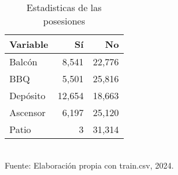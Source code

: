 \begin{table}[H]
\centering
\caption{Estadisticas de las posesiones}
\begin{tabular}{lrr}
\toprule
Variable & Sí & No \\
\midrule
Balcón & 8,541 & 22,776 \\
BBQ & 5,501 & 25,816 \\
Depósito & 12,654 & 18,663 \\
Ascensor & 6,197 & 25,120 \\
Patio & 3 & 31,314 \\
\bottomrule
\end{tabular}
\label{tab:posesiones} \\
\footnotesize Fuente: Elaboración propia con train.csv, 2024.

\end{table}
